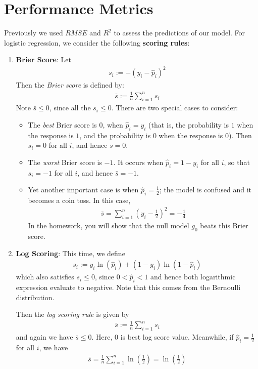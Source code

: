 \documentclass[12pt, a4paper]{article}
\theoremstyle{definition}
\begin{document}
	\section*{Performance Metrics}
	Previously we used $RMSE$ and $R^2$ to assess the predictions of our model.
	For logistic regression, we consider the following \textbf{scoring rules}:
	\begin{enumerate}[label=(\arabic*)]
		\item \textbf{Brier Score}: Let
		\begin{align*}
			s_i := -(y_i - \hat{p}_i)^2
		\end{align*}
		Then the \textit{Brier score} is defined by:
		\begin{align*}
			\bar{s} := \frac{1}{n}\sum_{i=1}^{n}s_i
		\end{align*}
		Note $\bar{s}\leq 0$, since all the $s_i\leq 0$. There are two special cases to consider:
		\begin{itemize}
			\item The \textit{best} Brier score is $0$, when $\hat{p}_i=y_i$
			(that is, the probability is $1$ when the response is $1$, and the probability
			is $0$ when the response is $0$). Then $s_i=0$ for all $i$, and hence
			$\bar{s}=0$.
			\item The \textit{worst} Brier score is $-1$. It occurs when $\hat{p}_i=1-y_i$
			for all $i$, so that $s_i=-1$ for all $i$, and hence $\bar{s}=-1$.
			\item Yet another important case is when $\hat{p}_i = \frac{1}{2}$; the model
			is confused and it becomes a coin toss. In this case,
			\begin{align*}
				\bar{s}=\sum_{i=1}^{n}\left(y_i - \frac{1}{2}\right)^2 = -\frac{1}{4}
			\end{align*}
			In the homework, you will show that the null model $g_0$ beats this Brier score.
		\end{itemize}
		\item \textbf{Log Scoring}: This time, we define
		\begin{align*}
			s_i := y_i\ln(\hat{p}_i) + (1- y_i)\ln(1-\hat{p}_i)
		\end{align*}
		which also satisfies $s_i\leq 0$, since $0<\hat{p}_i<1$ and hence
		both logarithmic expression evaluate to negative. Note that this comes from
		the Bernoulli distribution.
		
		Then the \textit{log scoring rule}
		is given by
		\begin{align*}
			\bar{s} := \frac{1}{n}\sum_{i=1}^{n}s_i
		\end{align*}
		and again we have $\bar{s}\leq 0$. Here, $0$ is best log score value.
		Meanwhile, if $\hat{p}_i=\frac{1}{2}$ for all $i$, we have
		\begin{align*}
			\bar{s} = \frac{1}{n}\sum_{i=1}^{n}\ln\left(\frac{1}{2}\right)=\ln\left(\frac{1}{2}\right)
		\end{align*}
	\end{enumerate}
	\pagebreak
	\printbibliography
\end{document}

